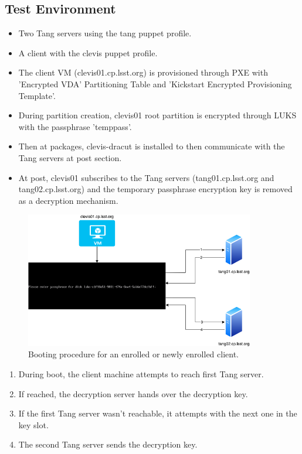 \newpage
\subsection{Test Environment}
\begin{itemize}
  \item Two Tang servers using the tang puppet profile.
  \item A client with the clevis puppet profile.
  \item The client VM (clevis01.cp.lsst.org) is provisioned through PXE with 'Encrypted VDA' Partitioning Table and 'Kickstart Encrypted Provisioning Template'.
  \item During partition creation, clevis01 root partition is encrypted through LUKS with the passphrase 'temppass'.
  \item Then at packages, clevis-dracut is installed to then communicate with the Tang servers at post section.
  \item At post, clevis01 subscribes to the Tang servers (tang01.cp.lsst.org and tang02.cp.lsst.org) and the temporary passphrase encryption key is removed as a decryption mechanism.
\end{itemize}

\begin{figure}
  \includegraphics[width=10cm]{images/image4.png}
  \centering
  \caption{Booting procedure for an enrolled or newly enrolled client.}
\end{figure}

\begin{enumerate}
  \item During boot, the client machine attempts to reach first Tang server.
  \item If reached, the decryption server hands over the decryption key.
  \item If the first Tang server wasn't reachable, it attempts with the next one in the key slot.
  \item The second Tang server sends the decryption key.
\end{enumerate}

